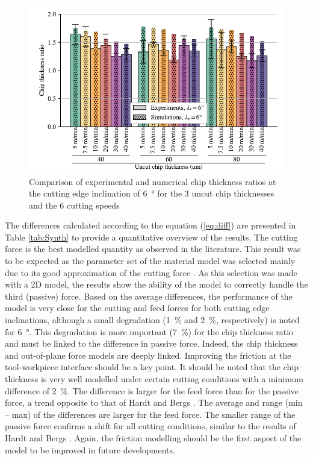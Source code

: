 \documentclass[preprint,12pt,times]{elsarticle}
\begin{document}
\begin{figure}[!h]
\centering
\includegraphics[width = 140 mm]{Figures/h6}
\caption{Comparison of experimental and numerical chip thickness ratios at the cutting edge inclination of \qty{6}{\degree} for the 3 uncut chip thicknesses and the 6 cutting speeds}
\label{fig:h6}
\end{figure}

The differences calculated according to the equation (\ref{eq:diff}) are presented in Table \ref{tab:Synth} to provide a quantitative overview of the results. The cutting force is the best modelled quantity as observed in the literature. This result was to be expected as the parameter set of the material model was selected mainly due to its good approximation of the cutting force \cite{ducobu_Importance_2017}. As this selection was made with a 2D model, the results show the ability of the model to correctly handle the third (passive) force. Based on the average differences, the performance of the model is very close for the cutting and feed forces for both cutting edge inclinations, although a small degradation (\qty{1}{\%} and \qty{2}{\%}, respectively) is noted for \qty{6}{\degree}. This degradation is more important (\qty{7}{\%}) for the chip thickness ratio and must be linked to the difference in passive force. Indeed, the chip thickness and out-of-plane force models are deeply linked. Improving the friction at the tool-workpiece interface should be a key point. It should be noted that the chip thickness is very well modelled under certain cutting conditions with a minimum difference of \qty{2}{\%}. The difference is larger for the feed force than for the passive force, a trend opposite to that of Hardt and Bergs \cite{hardt_Three_2021}. The average and range (min -- max) of the differences are larger for the feed force. The smaller range of the passive force confirms a shift for all cutting conditions, similar to the results of Hardt and Bergs \cite{hardt_Three_2021}. Again, the friction modelling should be the first aspect of the model to be improved in future developments.
\end{document}
